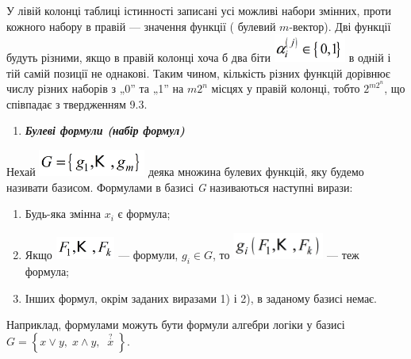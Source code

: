 \bigskip


\bigskip


\bigskip


\bigskip


\bigskip


\bigskip


\bigskip


\bigskip


\bigskip


\bigskip


\bigskip


\bigskip

У лівій колонці таблиці істинності записані усі можливі набори змінних, проти
кожного набору в правій --- значення функції ( булевий   ${m}${}-вектор). Дві
функції будуть різними, якщо в правій колонці хоча б два біти  
\includegraphics[width=0.9335in,height=0.3618in]{crypt-img/crypt-img102.png}  в
одній і тій самій позиції не однакові. Таким чином, кількість різних функцій
дорівнює числу різних наборів з „0” та „1”  на   ${\mathit{m2}^{{n}}}$ місцях у
правій колонці, тобто   ${2^{{\mathit{m2}^{{n}}}}}$, що співпадає з твердженням
 9.3.


\bigskip

\liststyleWWviiiNumlii
\setcounter{saveenum}{\value{enumi}}
\begin{enumerate}
\setcounter{enumi}{\value{saveenum}}
\item {\bfseries\itshape
Булеві формули (набір формул)}
\end{enumerate}
Нехай 
\includegraphics[width=1.3854in,height=0.3465in]{crypt-img/crypt-img103.png} 
деяка множина булевих функцій, яку будемо називати  базисом. Формулами в базисі
 \textit{G  }називаються наступні вирази:

\liststyleWWviiiNumv
\begin{enumerate}
\item Будь-яка змінна  ${x_{{i}}}$ є формула;
\item Якщо 
\includegraphics[width=0.7717in,height=0.2984in]{crypt-img/crypt-img104.png}  ---
формули,  ${g_{{i}}\in G}$, то 
\includegraphics[width=1.1811in,height=0.3465in]{crypt-img/crypt-img105.png}  ---
теж формула;
\item Інших формул, окрім заданих виразами 1) і 2), в заданому базисі немає.
\end{enumerate}
Наприклад, формулами  можуть бути формули алгебри логіки  у базисі  
${G=\left\{x\vee y,\;x\wedge y,\;\;\overset{{?}}{{x}}\;\right\}}$. 

